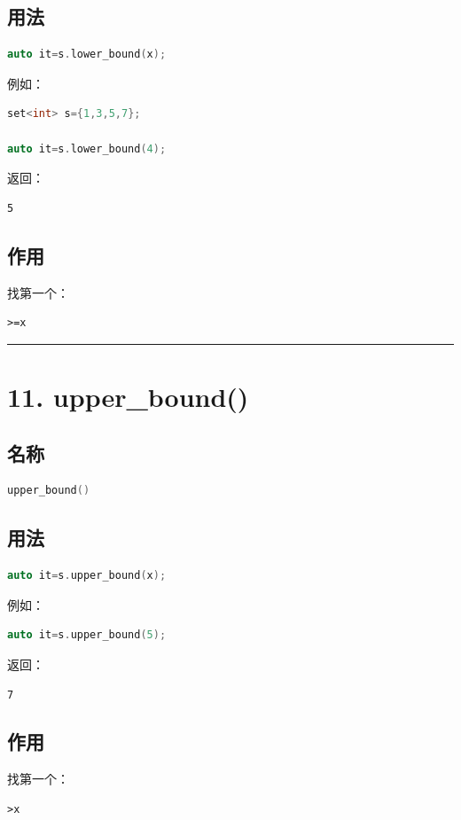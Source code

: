 \documentclass[10pt,twocolumn]{extarticle}
\begin{document}
\subsection{用法}
\begin{lstlisting}[language=C++]
auto it=s.lower_bound(x);
\end{lstlisting}
例如：
\begin{lstlisting}[language=C++]
set<int> s={1,3,5,7};

auto it=s.lower_bound(4);
\end{lstlisting}
返回：
\begin{lstlisting}
5
\end{lstlisting}

\subsection{作用}
找第一个：
\begin{lstlisting}
>=x
\end{lstlisting}

\noindent\rule{\linewidth}{0.4pt}

\section{11. upper\_bound()}

\subsection{名称}
\begin{lstlisting}[language=C++]
upper_bound()
\end{lstlisting}

\subsection{用法}
\begin{lstlisting}[language=C++]
auto it=s.upper_bound(x);
\end{lstlisting}
例如：
\begin{lstlisting}[language=C++]
auto it=s.upper_bound(5);
\end{lstlisting}
返回：
\begin{lstlisting}
7
\end{lstlisting}

\subsection{作用}
找第一个：
\begin{lstlisting}
>x
\end{lstlisting}
\end{document}
